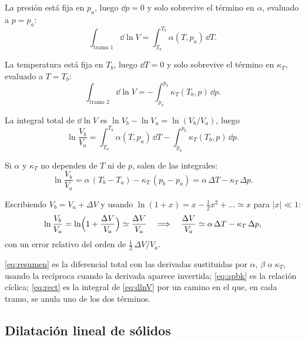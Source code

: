  La presión está fija en $p_a$, luego
$\dd p=0$ y solo sobrevive el término en $\alpha$, evaluado a $p=p_a$:
\[
  \int_{\text{tramo 1}}\dd\ln V=\int_{T_a}^{T_b}\alpha(T,p_a)\,\dd T.
\]

 La temperatura está fija en $T_b$, luego
$\dd T=0$ y solo sobrevive el término en $\kappa_T$, evaluado a $T=T_b$:
\[
  \int_{\text{tramo 2}}\dd\ln V=-\int_{p_a}^{p_b}\kappa_T(T_b,p)\,\dd p.
\]

 La integral total de $\dd\ln V$ es $\ln V_b-\ln V_a=\ln(V_b/V_a)$, luego
\begin{equation}\label{eq:rect}
  \ln\frac{V_b}{V_a}=\int_{T_a}^{T_b}\alpha(T,p_a)\,\dd T-\int_{p_a}^{p_b}\kappa_T(T_b,p)\,\dd p.
\end{equation}

 Si $\alpha$ y $\kappa_T$ no dependen de $T$ ni de $p$, salen de las integrales:
\begin{equation}\label{eq:const}
  \ln\frac{V_b}{V_a}=\alpha\,(T_b-T_a)-\kappa_T\,(p_b-p_a)=\alpha\,\Delta T-\kappa_T\,\Delta p.
\end{equation}

 Escribiendo $V_b=V_a+\Delta V$ y usando
$\ln(1+x)=x-\tfrac12x^2+\dots\simeq x$ para $|x|\ll1$:
\begin{equation}\label{eq:pequenos}
  \ln\frac{V_b}{V_a}=\ln\Bigl(1+\frac{\Delta V}{V_a}\Bigr)\simeq\frac{\Delta V}{V_a}
  \quad\Longrightarrow\quad \frac{\Delta V}{V_a}\simeq\alpha\,\Delta T-\kappa_T\,\Delta p,
\end{equation}
con un error relativo del orden de $\tfrac12\,\Delta V/V_a$.

\begin{observacion}
\eqref{eq:resumen} es la diferencial total con las derivadas sustituidas por $\alpha$, $\beta$ o
$\kappa_T$, usando la recíproca cuando la derivada aparece invertida; \eqref{eq:apbk} es la relación
cíclica; \eqref{eq:rect} es la integral de \eqref{eq:dlnV} por un camino en el que, en cada tramo, se
anula uno de los dos términos.
\end{observacion}

\subsection{Dilatación lineal de sólidos}

